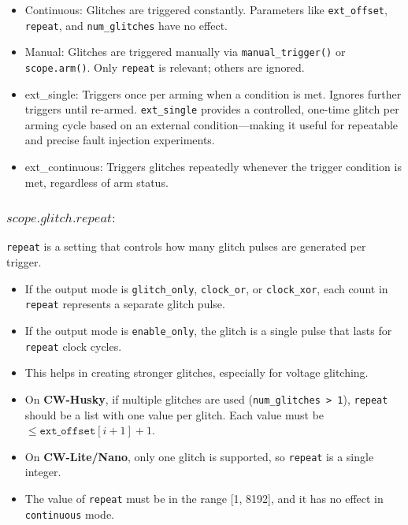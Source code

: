 \begin{itemize}
    \item Continuous: Glitches are triggered constantly. Parameters like \texttt{ext\_offset}, \texttt{repeat}, and \texttt{num\_glitches} have no effect.
    
    \item Manual: Glitches are triggered manually via \texttt{manual\_trigger()} or \texttt{scope.arm()}. Only \texttt{repeat} is relevant; others are ignored.
    
    \item ext\_single: Triggers once per arming when a condition is met. Ignores further triggers until re-armed. \texttt{ext\_single} provides a controlled, one-time glitch per arming cycle based on an external condition—making it useful for repeatable and precise fault injection experiments.
    
    \item ext\_continuous: Triggers glitches repeatedly whenever the trigger condition is met, regardless of arm status.
\end{itemize}
\subsubsection{$scope.glitch.repeat :$}
\texttt{repeat} is a setting that controls how many glitch pulses are generated per trigger.

\begin{itemize}
    \item If the output mode is \texttt{glitch\_only}, \texttt{clock\_or}, or \texttt{clock\_xor}, each count in \texttt{repeat} represents a separate glitch pulse.
    
    \item If the output mode is \texttt{enable\_only}, the glitch is a single pulse that lasts for \texttt{repeat} clock cycles.
    
    \item This helps in creating stronger glitches, especially for voltage glitching.
    
    \item On \textbf{CW-Husky}, if multiple glitches are used (\texttt{num\_glitches > 1}), \texttt{repeat} should be a list with one value per glitch. Each value must be $\leq \texttt{ext\_offset}[i+1] + 1$.
    
    \item On \textbf{CW-Lite/Nano}, only one glitch is supported, so \texttt{repeat} is a single integer.
    
    \item The value of \texttt{repeat} must be in the range [1, 8192], and it has no effect in \texttt{continuous} mode.
\end{itemize}
